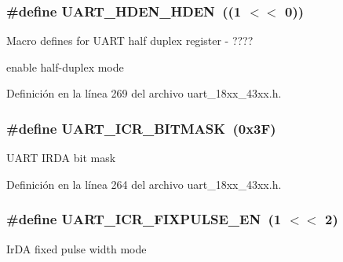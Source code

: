 \subsubsection[{\texorpdfstring{U\+A\+R\+T\+\_\+\+H\+D\+E\+N\+\_\+\+H\+D\+EN}{UART_HDEN_HDEN}}]{\setlength{\rightskip}{0pt plus 5cm}\#define U\+A\+R\+T\+\_\+\+H\+D\+E\+N\+\_\+\+H\+D\+EN~((1 $<$$<$ 0))}\hypertarget{group___u_a_r_t__18_x_x__43_x_x_ga3affaa6bd622295bd6ea0c9f4a70b19c}{}\label{group___u_a_r_t__18_x_x__43_x_x_ga3affaa6bd622295bd6ea0c9f4a70b19c}


Macro defines for U\+A\+RT half duplex register -\/ ???? 

enable half-\/duplex mode 

Definición en la línea 269 del archivo uart\+\_\+18xx\+\_\+43xx.\+h.

\subsubsection[{\texorpdfstring{U\+A\+R\+T\+\_\+\+I\+C\+R\+\_\+\+B\+I\+T\+M\+A\+SK}{UART_ICR_BITMASK}}]{\setlength{\rightskip}{0pt plus 5cm}\#define U\+A\+R\+T\+\_\+\+I\+C\+R\+\_\+\+B\+I\+T\+M\+A\+SK~(0x3\+F)}\hypertarget{group___u_a_r_t__18_x_x__43_x_x_ga822d618fad4a8a146fd8113f827b5d09}{}\label{group___u_a_r_t__18_x_x__43_x_x_ga822d618fad4a8a146fd8113f827b5d09}
U\+A\+RT I\+R\+DA bit mask 

Definición en la línea 264 del archivo uart\+\_\+18xx\+\_\+43xx.\+h.

\subsubsection[{\texorpdfstring{U\+A\+R\+T\+\_\+\+I\+C\+R\+\_\+\+F\+I\+X\+P\+U\+L\+S\+E\+\_\+\+EN}{UART_ICR_FIXPULSE_EN}}]{\setlength{\rightskip}{0pt plus 5cm}\#define U\+A\+R\+T\+\_\+\+I\+C\+R\+\_\+\+F\+I\+X\+P\+U\+L\+S\+E\+\_\+\+EN~(1 $<$$<$ 2)}\hypertarget{group___u_a_r_t__18_x_x__43_x_x_gae022dc3e5ad94f95d2805294d97594cd}{}\label{group___u_a_r_t__18_x_x__43_x_x_gae022dc3e5ad94f95d2805294d97594cd}
Ir\+DA fixed pulse width mode 


